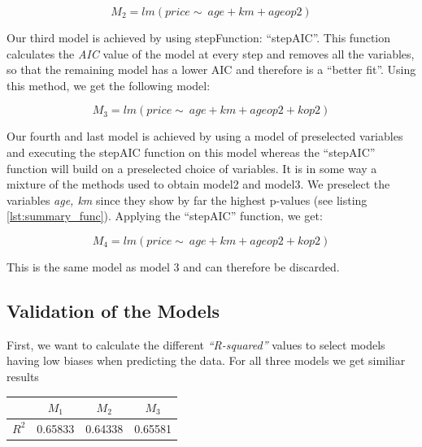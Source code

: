 \begin{equation}\label{eq:model2}
	M_2 = lm(price \sim\ age + km + ageop2)
\end{equation}

Our third model is achieved by using stepFunction: ``stepAIC''. 
This function calculates the \emph{AIC} value of the model at every step and 
removes all the variables, so that the remaining model has a lower AIC and  
therefore is a ``better fit''.
Using this method, we get the following model:

\begin{equation}\label{eq:model3}
	M_3 = lm(price \sim\ age + km + ageop2 + kop2)
\end{equation}

Our fourth and last model is achieved by using a model of preselected 
variables and executing the stepAIC function on this model whereas the 
``stepAIC'' function will build on a preselected choice of variables.
It is in some way a mixture of the methods used to obtain model2 and model3. 
We preselect the variables \emph{age, km} since they show by far the highest p-values (see listing \ref{lst:summary_func}). Applying the ``stepAIC'' function, we get: 

\begin{equation}\label{eq:model4}
	M_4 = lm(price \sim\ age + km + ageop2 + kop2)
\end{equation} 

This is the same model as model 3 and can therefore be discarded.

\subsection{Validation of the Models} %
\label{sub:validation_of_the_models}

First, we want to calculate the different \emph{``R-squared''} values to select models having low biases when predicting the data. 
For all three models we get similiar results

\begin{table}[ht]
\begin{center}
\begin{tabular}{ |c|c|c|c| } 
 \hline
 & $M_1$ & $M_2$ & $M_3$ \\ 
 \hline
 $R^2$ &  0.65833 & 0.64338 & 0.65581 \\ 
 \hline
\end{tabular}
\end{center}
\end{table}

